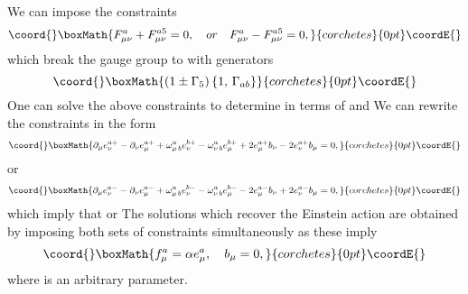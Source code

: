 \documentclass[a4paper,a4paper]{article}
\begin{document}
We can impose the constraints
\[\coord{}\boxMath{
F_{\mu\nu}^{a}+F_{\mu\nu}^{a5}=0,\quad or\quad F_{\mu\nu}^{a}-F_{\mu\nu}%
^{a5}=0,
}{corchetes}{0pt}\coordE{}\]
which break the gauge group \coordHE{} to \coordHE{} with generators
\[\coord{}\boxMath{
\left(  1\pm\Gamma_{5}\right)  \left\{  1,\,\Gamma_{ab}\right\}
}{corchetes}{0pt}\coordE{}\]
One can solve the above constraints to determine \coordHE{} in terms
of \coordHE{} and \coordHE{} We can rewrite
the constraints in the form
\[\coord{}\boxMath{
\partial_{\mu}e_{\nu}^{a+}-\partial_{\nu}e_{\mu}^{a+}+\omega_{\mu\,b}%
^{a}e_{\nu}^{b+}-\omega_{\nu\,b}^{a}e_{\mu}^{b+}+2e_{\mu}^{a+}b_{\nu}-2e_{\nu
}^{a+}b_{\mu}=0,
}{corchetes}{0pt}\coordE{}\]
or
\[\coord{}\boxMath{
\partial_{\mu}e_{\nu}^{a-}-\partial_{\nu}e_{\mu}^{a-}+\omega_{\mu\,b}%
^{a}e_{\nu}^{b-}-\omega_{\nu\,b}^{a}e_{\mu}^{b-}-2e_{\mu}^{a-}b_{\nu}+2e_{\nu
}^{a-}b_{\mu}=0,
}{corchetes}{0pt}\coordE{}\]
which imply that \coordHE{} or \coordHE{} The solutions which recover the Einstein action are
obtained by imposing both sets of constraints simultaneously as these imply
\[\coord{}\boxMath{
f_{\mu}^{a}=\alpha e_{\mu}^{a},\quad b_{\mu}=0,
}{corchetes}{0pt}\coordE{}\]
where \myHighlight{$\alpha$}\coordHE{} is an arbitrary parameter.
\end{document}
